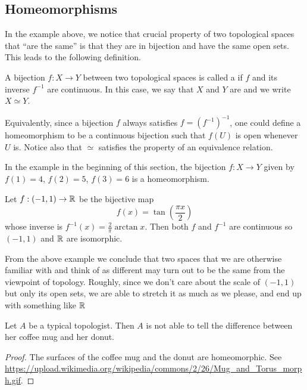 \subsection{Homeomorphisms}
In the example above, we notice that crucial property of two topological spaces that ``are the same'' is that they are in bijection and have the same open sets. This leads to the following definition.
\begin{defn}
  A bijection $f : X \to Y$ between two topological spaces is called a  if $f$ and its inverse $f^{-1}$ are continuous. In this case, we say that $X$ and $Y$ are  and we write $X \simeq Y$.
\end{defn}
Equivalently, since a bijection $f$ always satisfies $f = (f^{-1})^{-1}$, one could define a homeomorphism to be a continuous bijection such that $f(U)$ is open whenever $U$ is. Notice also that $\simeq$ satisfies the property of an equivalence relation.
\begin{example}
  In the example in the beginning of this section, the bijection $f : X \to Y$ given by $f(1) = 4$, $f(2) = 5$, $f(3) = 6$ is a homeomorphism.
\end{example}
\begin{example}
  Let $f : (-1 , 1) \to \mathbb{R}$ be the bijective map
  \[
    f(x) = \tan \left( \frac{\pi x}{2} \right)
  \]
  whose inverse is $f^{-1}(x) = \tfrac{2}{\pi} \arctan x$. Then both $f$ and $f^{-1}$ are continuous so $(-1,1)$ and $\mathbb{R}$ are isomorphic.
\end{example}
From the above example we conclude that two spaces that we are otherwise familiar with and think of as different may turn out to be the same from the viewpoint of topology. Roughly, since we don't care about the scale of $(-1,1)$ but only its open sets, we are able to stretch it as much as we please, and end up with something like $\mathbb{R}$
\begin{badjoke}
  Let $A$ be a typical topologist. Then $A$ is not able to tell the difference between her coffee mug and her donut.
\end{badjoke}
\begin{proof}
  The surfaces of the coffee mug and the donut are homeomorphic. See \url{https://upload.wikimedia.org/wikipedia/commons/2/26/Mug_and_Torus_morph.gif}.
\end{proof}

